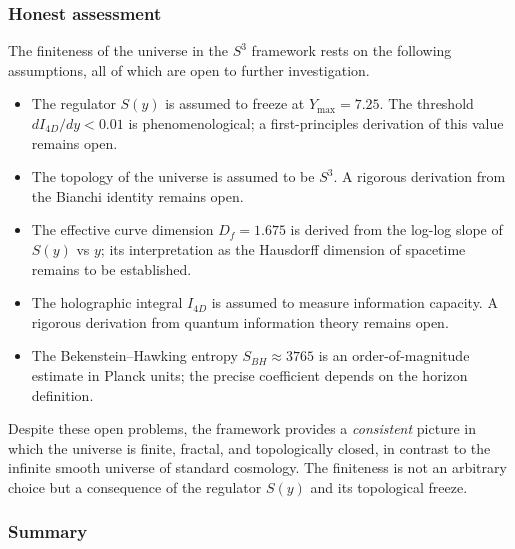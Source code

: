 \documentclass[a4paper,1pt,oneside,openany]{book}
\begin{document}
\subsubsection{Honest assessment}

The finiteness of the universe in the $S^{3}$ framework rests 
on the following assumptions, all of which are open to further 
investigation.

\begin{itemize}
\item The regulator $S(y)$ is assumed to freeze at 
$Y_{\max}=7.25$. The threshold $dI_{4D}/dy<0.01$ is 
phenomenological; a first-principles derivation of this value 
remains open.
\item The topology of the universe is assumed to be $S^{3}$. A 
rigorous derivation from the Bianchi identity remains open.
\item The effective curve dimension $D_{f}=1.675$ is derived 
from the log-log slope of $S(y)$ vs $y$; its interpretation as 
the Hausdorff dimension of spacetime remains to be established.
\item The holographic integral $I_{4D}$ is assumed to measure 
information capacity. A rigorous derivation from quantum 
information theory remains open.
\item The Bekenstein--Hawking entropy $S_{BH}\approx 3765$ is an 
order-of-magnitude estimate in Planck units; the precise 
coefficient depends on the horizon definition.
\end{itemize}

Despite these open problems, the framework provides a 
\emph{consistent} picture in which the universe is finite, 
fractal, and topologically closed, in contrast to the infinite 
smooth universe of standard cosmology. The finiteness is not an 
arbitrary choice but a consequence of the regulator $S(y)$ and 
its topological freeze.

\subsubsection{Summary}
\end{document}
